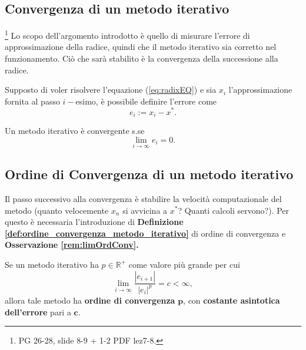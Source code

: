 \subsection{Convergenza di un metodo iterativo}\footnote{PG 26-28, slide 8-9 + 1-2 PDF lez7-8.} Lo scopo dell'argomento introdotto è quello di misurare l'errore di approssimazione della radice, quindi che il metodo iterativo sia corretto nel funzionamento. Ciò che sarà stabilito è la convergenza della successione alla radice.
\begin{definition}
	Supposto di voler risolvere l'equazione (\ref{eq:radixEQ}) e sia $x_i$ l'approssimazione fornita al passo $i-$esimo, è possibile definire l'errore come
	\begin{equation}\label{eq:errore_metodo_iterativo}
		e_i:=x_i-x^*.
	\end{equation}
\end{definition} 

\begin{definition}
	Un metodo iterativo è convergente s.se \begin{equation}\label{eq:limite_errore_metodo_convergente}
		\lim_{i\to\infty}{e_i}=0.
	\end{equation}
\end{definition}

\subsection{Ordine di Convergenza di un metodo iterativo}
Il passo successivo alla convergenza è stabilire la velocità computazionale del metodo (quanto velocemente $x_n$ si avvicina a $x^*$? Quanti calcoli servono?). Per questo è necessaria l'introduzione di \textbf{Definizione \ref{def:ordine_convergenza_metodo_iterativo}} di ordine di convergenza e \textbf{Osservazione \ref{rem:limOrdConv}.}
\begin{definition} \label{def:ordine_convergenza_metodo_iterativo}
	Se un metodo iterativo ha $p\in\mathbb R^+$ come valore più grande per cui \begin{equation}\label{eq:limOrdConv}
		\lim_{i\to\infty}{\frac{|e_{i+1}|}{|e_i|^p}}=c<\infty,
	\end{equation}
	allora tale metodo ha \textbf{ordine di convergenza} $\boldsymbol p$, con \textbf{costante asintotica dell'errore} pari a $\boldsymbol c$.
\end{definition}

